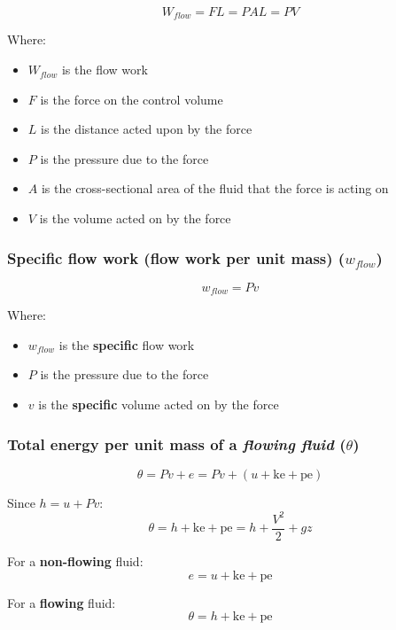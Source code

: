 \documentclass[11pt]{article}
\begin{document}
\[W_{flow} = FL = PAL = PV\]

Where:
\begin{itemize}
\item \(W_{flow}\) is the flow work
\item \(F\) is the force on the control volume
\item \(L\) is the distance acted upon by the force
\item \(P\) is the pressure due to the force
\item \(A\) is the cross-sectional area of the fluid that the force is acting on
\item \(V\) is the volume acted on by the force
\end{itemize}

\subsubsection{Specific flow work (flow work per unit mass) (\(w_{flow}\))}
\label{sec:org5e3e828}
\[w_{flow} = Pv\]

Where:
\begin{itemize}
\item \(w_{flow}\) is the \textbf{specific} flow work
\item \(P\) is the pressure due to the force
\item \(v\) is the \textbf{specific} volume acted on by the force
\end{itemize}

\subsubsection{Total energy per unit mass of a \emph{flowing fluid} (\(\theta\))}
\label{sec:org1ea4da2}
\[\theta = Pv + e = Pv + (u + \text{ke} + \text{pe})\]

Since \(h = u + Pv\):
\[\theta = h + \text{ke} + \text{pe} = h + \frac{V^2}{2} + gz\]

For a \textbf{non-flowing} fluid:
\[e = u + \text{ke} + \text{pe}\]

For a \textbf{flowing} fluid:
\[\theta = h + \text{ke} + \text{pe}\]
\end{document}
